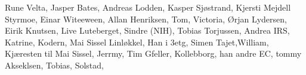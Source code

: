 Rune Velta, Jasper Bates, Andreas Lodden, Kasper Sjøstrand, Kjersti Mejdell Styrmoe, Einar Witeeween, Allan Henriksen, Tom, Victoria, Ørjan Lydersen, Eirik Knutsen, Live Luteberget, Sindre (NIH), Tobias Torjussen, Andrea IRS, Katrine, Kodern, Mai Sissel Linløkkel, Han i 3etg, Simen Tajet,William, Kjæresten til Mai Sissel, Jerrmy, Tim Gfeller, Kollebborg, han andre EC, tommy Akseklsen, Tobias, Solstad, 